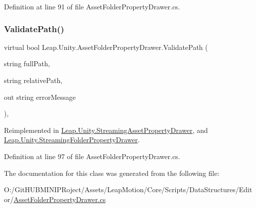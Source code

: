 Definition at line 91 of file Asset\+Folder\+Property\+Drawer.\+cs.

\mbox{\label{class_leap_1_1_unity_1_1_asset_folder_property_drawer_a758121df1db1aa0c8e81154f239297a6}} 
\subsubsection{\texorpdfstring{ValidatePath()}{ValidatePath()}}
{\footnotesize\ttfamily virtual bool Leap.\+Unity.\+Asset\+Folder\+Property\+Drawer.\+Validate\+Path (\begin{DoxyParamCaption}\item[{string}]{full\+Path,  }\item[{string}]{relative\+Path,  }\item[{out string}]{error\+Message }\end{DoxyParamCaption})\hspace{0.3cm}{\ttfamily [protected]}, {\ttfamily [virtual]}}



Reimplemented in \mbox{\hyperlink{class_leap_1_1_unity_1_1_streaming_asset_property_drawer_aae138f9f79b66b7da1943b14524d795f}{Leap.\+Unity.\+Streaming\+Asset\+Property\+Drawer}}, and \mbox{\hyperlink{class_leap_1_1_unity_1_1_streaming_folder_property_drawer_a089e68d00c4882ff5f1d71a4f05a4d99}{Leap.\+Unity.\+Streaming\+Folder\+Property\+Drawer}}.



Definition at line 97 of file Asset\+Folder\+Property\+Drawer.\+cs.



The documentation for this class was generated from the following file\+:\begin{DoxyCompactItemize}
\item 
O\+:/\+Git\+H\+U\+B\+M\+I\+N\+I\+P\+Roject/\+Assets/\+Leap\+Motion/\+Core/\+Scripts/\+Data\+Structures/\+Editor/\mbox{\hyperlink{_asset_folder_property_drawer_8cs}{Asset\+Folder\+Property\+Drawer.\+cs}}\end{DoxyCompactItemize}
